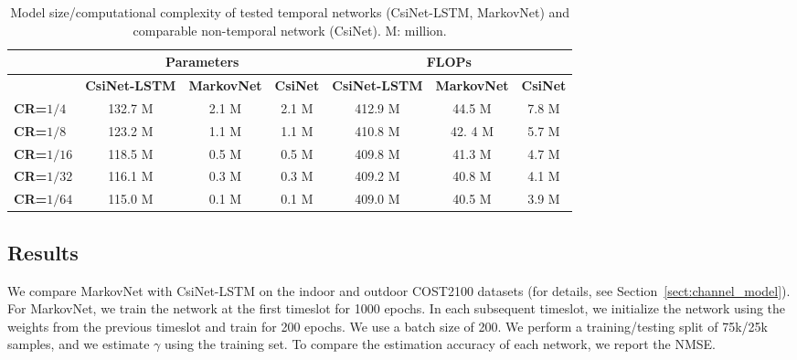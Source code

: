 \begin{table}[htb]
  \renewcommand{\arraystretch}{1}
  \begin{center}
  \caption{Model size/computational complexity of tested temporal networks (CsiNet-LSTM, MarkovNet) and comparable non-temporal network (CsiNet). M: million.}
  \label{tab:comp-complex} 
  \footnotesize{
	  \begin{tabular}{|l|c|c|c|c|c|c|}
	  \hline
	                              & \multicolumn{3}{c|}{\textbf{Parameters}} & \multicolumn{3}{c|}{\textbf{FLOPs}} \\ \hline
	                              & \textbf{CsiNet-LSTM} & \textbf{MarkovNet} & \textbf{CsiNet} & \textbf{CsiNet-LSTM} & \textbf{MarkovNet} & \textbf{CsiNet} \\ \hline
	  \textbf{CR=$1/4$}  		  & 132.7 M              & 2.1 M              & 2.1 M  			& 412.9 M              & 44.5 M             & 7.8 M           \\ \hline
	  \textbf{CR=$1/8$}  		  & 123.2 M              & 1.1 M              & 1.1 M  			& 410.8 M              & 42.	4 M             & 5.7 M           \\ \hline
	  \textbf{CR=$1/16$} 		  & 118.5 M              & 0.5 M              & 0.5 M 			& 409.8 M              & 41.3 M             & 4.7 M           \\ \hline
	  \textbf{CR=$1/32$} 		  & 116.1 M              & 0.3 M              & 0.3 M           & 409.2 M              & 40.8 M             & 4.1 M           \\ \hline
	  \textbf{CR=$1/64$} 		  & 115.0 M              & 0.1 M              & 0.1 M 			& 409.0 M              & 40.5 M             & 3.9 M           \\ \hline
	  \end{tabular}
  }
  \end{center}
\end{table} 

\subsection{Results} \label{sec:markov-results}

We compare MarkovNet with CsiNet-LSTM \cite{ref:Wang2019CsiNetLSTM} on the indoor and outdoor COST2100 datasets (for details, see Section~\ref{sect:channel_model}). For MarkovNet, we train the network at the first timeslot for 1000 epochs. In each subsequent timeslot, we initialize the network using the weights from the previous timeslot and train for 200 epochs. We use a batch size of 200. We perform a training/testing split of 75k/25k samples, and we estimate $\gamma$ using the training set. To compare the estimation accuracy of each network, we report the NMSE.

